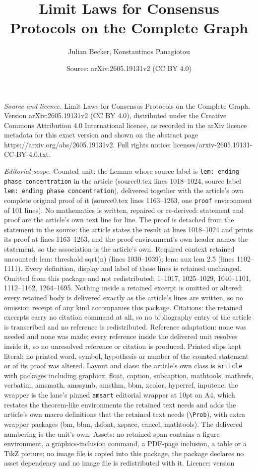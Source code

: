 \documentclass[10pt,a4paper]{amsart}
\title[Limit Laws for Consensus Protocols on the Complete Graph]{Limit Laws for Consensus Protocols on the Complete Graph}
\author{Julian Becker, Konstantinos Panagiotou}
\date{Source: arXiv:2605.19131v2 (CC BY 4.0)}
\begin{document}
\maketitle

\noindent\emph{Source and licence.} Limit Laws for Consensus Protocols on the Complete Graph. Version arXiv:2605.19131v2 (CC BY 4.0), distributed under the Creative Commons Attribution 4.0 International licence, as recorded in the arXiv licence metadata for this exact version and shown on the abstract page https://arxiv.org/abs/2605.19131v2. Full rights notice: licenses/arxiv-2605.19131-CC-BY-4.0.txt.\par\smallskip

\noindent\textit{Editorial scope.} Counted unit: the Lemma whose source label is \texttt{lem: ending phase concentration} in the article (source0.tex lines 1018--1024, source label \texttt{lem: ending phase concentration}), delivered together with the article's own complete original proof of it (source0.tex lines 1163--1263, one \texttt{proof} environment of 101 lines). No mathematics is written, repaired or re-derived: statement and proof are the article's own text line for line. The proof is detached from the statement in the source: the article states the result at lines 1018--1024 and prints its proof at lines 1163--1263, and the proof environment's own header names the statement, so the association is the article's own. Required context retained uncounted: lem: threshold sqrt(n) (lines 1030--1039); lem: aux lem 2.5 (lines 1102--1111). Every definition, display and label of those lines is retained unchanged. Omitted from this package and not redistributed: 1--1017, 1025--1029, 1040--1101, 1112--1162, 1264--1695. Nothing inside a retained excerpt is omitted or altered: every retained body is delivered exactly as the article's lines are written, so no omission receipt of any kind accompanies this package. Citations: the retained excerpts carry no citation command at all, so no bibliography entry of the article is transcribed and no reference is redistributed. Reference adaptation: none was needed and none was made; every reference inside the delivered unit resolves inside it, so no unresolved reference or citation is produced. Printed slips kept literal: no printed word, symbol, hypothesis or number of the counted statement or of its proof was altered. Layout and class: the article's own class is \texttt{article} with packages including graphicx, float, caption, subcaption, mathtools, mathrsfs, verbatim, amsmath, amssymb, amsthm, bbm, xcolor, hyperref, inputenc; the wrapper is the lane's pinned \texttt{amsart} editorial wrapper at 10pt on A4, which restates the theorem-like environments the retained text needs and adds the article's own macro definitions that the retained text needs (\texttt{\textbackslash Prob}), with extra wrapper packages (bm, bbm, dsfont, xspace, cancel, mathtools). The delivered numbering is the unit's own. Assets: no retained span contains a figure environment, a graphics-inclusion command, a PDF-page inclusion, a table or a TikZ picture; no image file is copied into this package, the package declares no asset dependency and no image file is redistributed with it. Licence: version 
\end{document}

